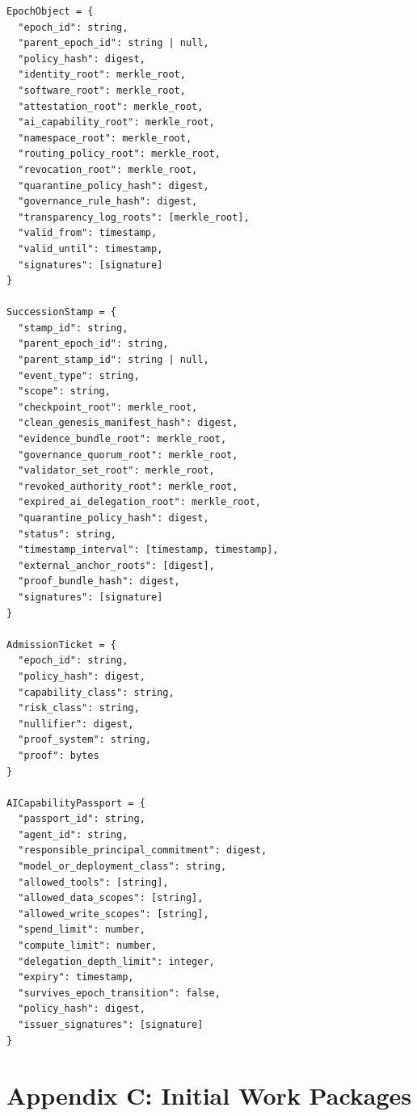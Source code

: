\documentclass[11pt,letterpaper]{article}
\begin{document}
\begin{lstlisting}[title={\textbf{Minimal JSON-like data model}}]
EpochObject = {
  "epoch_id": string,
  "parent_epoch_id": string | null,
  "policy_hash": digest,
  "identity_root": merkle_root,
  "software_root": merkle_root,
  "attestation_root": merkle_root,
  "ai_capability_root": merkle_root,
  "namespace_root": merkle_root,
  "routing_policy_root": merkle_root,
  "revocation_root": merkle_root,
  "quarantine_policy_hash": digest,
  "governance_rule_hash": digest,
  "transparency_log_roots": [merkle_root],
  "valid_from": timestamp,
  "valid_until": timestamp,
  "signatures": [signature]
}

SuccessionStamp = {
  "stamp_id": string,
  "parent_epoch_id": string,
  "parent_stamp_id": string | null,
  "event_type": string,
  "scope": string,
  "checkpoint_root": merkle_root,
  "clean_genesis_manifest_hash": digest,
  "evidence_bundle_root": merkle_root,
  "governance_quorum_root": merkle_root,
  "validator_set_root": merkle_root,
  "revoked_authority_root": merkle_root,
  "expired_ai_delegation_root": merkle_root,
  "quarantine_policy_hash": digest,
  "status": string,
  "timestamp_interval": [timestamp, timestamp],
  "external_anchor_roots": [digest],
  "proof_bundle_hash": digest,
  "signatures": [signature]
}

AdmissionTicket = {
  "epoch_id": string,
  "policy_hash": digest,
  "capability_class": string,
  "risk_class": string,
  "nullifier": digest,
  "proof_system": string,
  "proof": bytes
}

AICapabilityPassport = {
  "passport_id": string,
  "agent_id": string,
  "responsible_principal_commitment": digest,
  "model_or_deployment_class": string,
  "allowed_tools": [string],
  "allowed_data_scopes": [string],
  "allowed_write_scopes": [string],
  "spend_limit": number,
  "compute_limit": number,
  "delegation_depth_limit": integer,
  "expiry": timestamp,
  "survives_epoch_transition": false,
  "policy_hash": digest,
  "issuer_signatures": [signature]
}
\end{lstlisting}

\section{Appendix C: Initial Work Packages}
\end{document}
